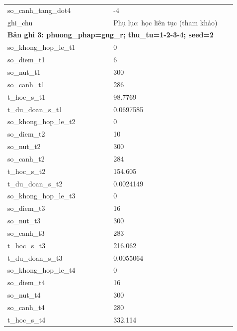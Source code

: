 \begin{longtable}{p{0.43\linewidth}p{0.50\linewidth}}
so\_\allowbreak canh\_\allowbreak tang\_\allowbreak dot4 & -4 \\
ghi\_\allowbreak chu & Phụ lục: học liên tục (tham khảo) \\
\midrule
\multicolumn{2}{p{0.95\linewidth}}{\textbf{Bản ghi 3: phuong\_phap=gng\_r; thu\_tu=1-2-3-4; seed=2}} \\
so\_\allowbreak khong\_\allowbreak hop\_\allowbreak le\_\allowbreak t1 & 0 \\
so\_\allowbreak diem\_\allowbreak t1 & 6 \\
so\_\allowbreak nut\_\allowbreak t1 & 300 \\
so\_\allowbreak canh\_\allowbreak t1 & 286 \\
t\_\allowbreak hoc\_\allowbreak s\_\allowbreak t1 & 98.7769 \\
t\_\allowbreak du\_\allowbreak doan\_\allowbreak s\_\allowbreak t1 & 0.0697585 \\
so\_\allowbreak khong\_\allowbreak hop\_\allowbreak le\_\allowbreak t2 & 0 \\
so\_\allowbreak diem\_\allowbreak t2 & 10 \\
so\_\allowbreak nut\_\allowbreak t2 & 300 \\
so\_\allowbreak canh\_\allowbreak t2 & 284 \\
t\_\allowbreak hoc\_\allowbreak s\_\allowbreak t2 & 154.605 \\
t\_\allowbreak du\_\allowbreak doan\_\allowbreak s\_\allowbreak t2 & 0.0024149 \\
so\_\allowbreak khong\_\allowbreak hop\_\allowbreak le\_\allowbreak t3 & 0 \\
so\_\allowbreak diem\_\allowbreak t3 & 16 \\
so\_\allowbreak nut\_\allowbreak t3 & 300 \\
so\_\allowbreak canh\_\allowbreak t3 & 283 \\
t\_\allowbreak hoc\_\allowbreak s\_\allowbreak t3 & 216.062 \\
t\_\allowbreak du\_\allowbreak doan\_\allowbreak s\_\allowbreak t3 & 0.0055064 \\
so\_\allowbreak khong\_\allowbreak hop\_\allowbreak le\_\allowbreak t4 & 0 \\
so\_\allowbreak diem\_\allowbreak t4 & 16 \\
so\_\allowbreak nut\_\allowbreak t4 & 300 \\
so\_\allowbreak canh\_\allowbreak t4 & 280 \\
t\_\allowbreak hoc\_\allowbreak s\_\allowbreak t4 & 332.114 \\

\end{longtable}
